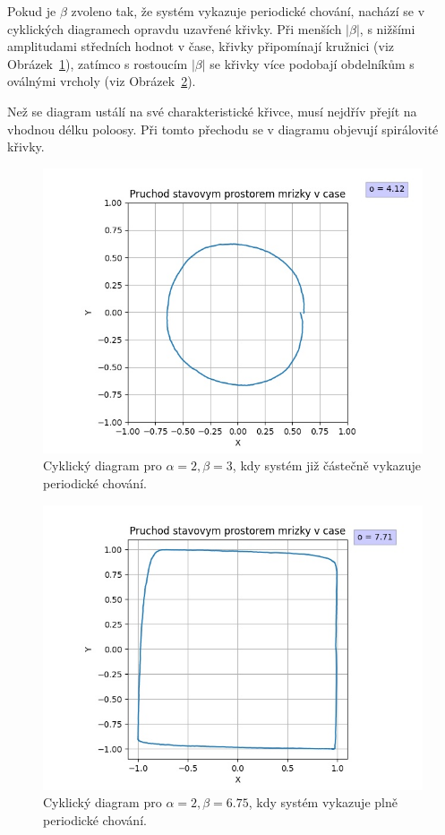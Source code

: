 \documentclass{article}
\begin{document}
Pokud je $\beta$ zvoleno tak, že systém vykazuje periodické chování, nachází se v cyklických diagramech opravdu uzavřené křivky. Při menších $|\beta|$, s nižšími amplitudami středních hodnot v čase, křivky připomínají kružnici (viz Obrázek~\ref{fig:cycle_a2b3}), zatímco s rostoucím $|\beta|$ se křivky více podobají obdelníkům s oválnými vrcholy (viz Obrázek~\ref{fig:cycle_a2b6.75}).

Než se diagram ustálí na své charakteristické křivce, musí nejdřív přejít na vhodnou délku poloosy. Při tomto přechodu se v diagramu objevují spirálovité křivky.

\begin{figure}[H]
 \includegraphics[scale=0.8]{cycle_a2b3}
 \caption{Cyklický diagram pro $\alpha=2, \beta=3$, kdy systém již částečně vykazuje periodické chování.}
 \label{fig:cycle_a2b3}
\end{figure}

\begin{figure}[H]
 \includegraphics[scale=0.8]{cycle_a2b6.75}
 \caption{Cyklický diagram pro $\alpha=2, \beta=6.75$, kdy systém vykazuje plně periodické chování.}
 \label{fig:cycle_a2b6.75}
\end{figure}
\end{document}
